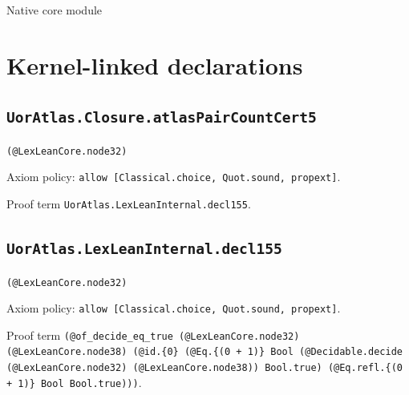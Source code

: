 \documentclass[11pt]{article}
\begin{document}
\begin{center}{\LARGE Native core module}\end{center}
\section*{Kernel-linked declarations}
\subsection*{\texttt{UorAtlas.Closure.atlasPairCountCert5}}
\noindent\texttt{(@LexLeanCore.node32)}\par
\noindent Axiom policy: \texttt{allow [Classical.choice, Quot.sound, propext]}.\par
\noindent Proof term \texttt{UorAtlas.LexLeanInternal.decl155}.\par
\subsection*{\texttt{UorAtlas.LexLeanInternal.decl155}}
\noindent\texttt{(@LexLeanCore.node32)}\par
\noindent Axiom policy: \texttt{allow [Classical.choice, Quot.sound, propext]}.\par
\noindent Proof term \texttt{(@of\_decide\_eq\_true (@LexLeanCore.node32) (@LexLeanCore.node38) (@id.\{0\} (@Eq.\{(0 + 1)\} Bool (@Decidable.decide (@LexLeanCore.node32) (@LexLeanCore.node38)) Bool.true) (@Eq.refl.\{(0 + 1)\} Bool Bool.true)))}.\par
\end{document}
